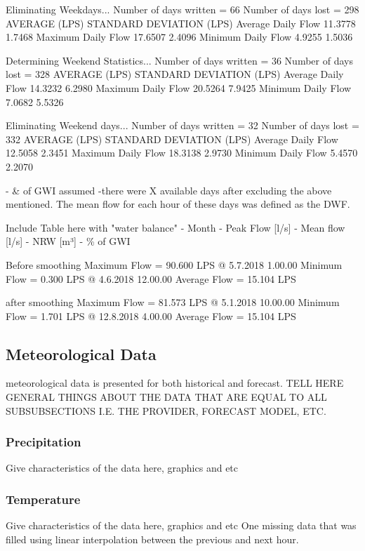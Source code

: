 Eliminating Weekdays...
 Number of days written = 66
 Number of days lost    = 298
                      AVERAGE (LPS)   STANDARD DEVIATION (LPS)
Average Daily Flow      11.3778                  1.7468
Maximum Daily Flow      17.6507                  2.4096
Minimum Daily Flow      4.9255                  1.5036


Determining Weekend Statistics...
 Number of days written = 36
 Number of days lost    = 328
                      AVERAGE (LPS)   STANDARD DEVIATION (LPS)
Average Daily Flow      14.3232                  6.2980
Maximum Daily Flow      20.5264                  7.9425
Minimum Daily Flow      7.0682                  5.5326

Eliminating Weekend days...
 Number of days written = 32
 Number of days lost    = 332
                      AVERAGE (LPS)   STANDARD DEVIATION (LPS)
Average Daily Flow      12.5058                  2.3451
Maximum Daily Flow      18.3138                  2.9730
Minimum Daily Flow      5.4570                  2.2070


- \& of GWI assumed
-there were X available days after excluding the above mentioned. The mean flow for each hour of these days was defined as the DWF.


Include Table here with "water balance" 
- Month - Peak Flow [l/s] - Mean flow [l/s] - NRW [m³] - \% of GWI


Before smoothing
Maximum Flow = 90.600 LPS @ 5.7.2018 1.00.00
Minimum Flow = 0.300 LPS @ 4.6.2018 12.00.00
Average Flow = 15.104 LPS

after smoothing
Maximum Flow = 81.573 LPS @ 5.1.2018 10.00.00
Minimum Flow = 1.701 LPS @ 12.8.2018 4.00.00
Average Flow = 15.104 LPS


    \subsection{Meteorological Data} \label{meteodata}
    meteorological data is presented for both historical and forecast. 
    TELL HERE GENERAL THINGS ABOUT THE DATA THAT ARE EQUAL TO ALL SUBSUBSECTIONS I.E. THE PROVIDER, FORECAST MODEL, ETC.
        \subsubsection{Precipitation}
        Give characteristics of the data here, graphics and etc
        \subsubsection{Temperature}
        Give characteristics of the data here, graphics and etc
        One missing data that was filled using linear interpolation between the previous and next hour.
